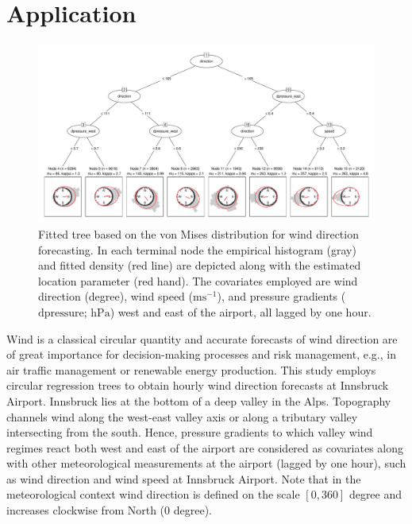 \documentclass[twoside]{report}
\begin{document}
\section{Application}

\begin{figure}[p!]\centering
\includegraphics[height = .5\textheight,angle=90,origin=c]{schlosser-circtree_plot.pdf}
\caption{Fitted tree based on the von Mises distribution for wind direction forecasting.
In each terminal node the empirical histogram (gray) and fitted density (red line)
are depicted along with the estimated location parameter (red hand). The covariates
employed are wind direction (degree), wind speed ($\text{ms}^{-1}$),
and pressure gradients ($\text{dpressure; hPa}$) west and east of the airport,
all lagged by one hour.}
\label{schlosser:fig_tree} \end{figure}

Wind is a classical circular quantity and accurate forecasts of wind direction
are of great importance for decision-making processes and risk management,
e.g., in air traffic management or renewable energy production. This study
employs circular regression trees to obtain hourly wind direction
forecasts at Innsbruck Airport.
Innsbruck lies at the bottom of a deep valley in the Alps. Topography
channels wind along the west-east valley axis or along a tributary valley
intersecting from the south. Hence, pressure gradients to which valley wind
regimes react both west and east of the airport are considered as covariates
along with other meteorological measurements at the airport (lagged by one hour),
such as wind direction and wind speed at Innsbruck Airport.
Note that in the meteorological context wind direction is defined on the scale $[0,360]$ degree and increases clockwise from North ($0$ degree).
\end{document}
